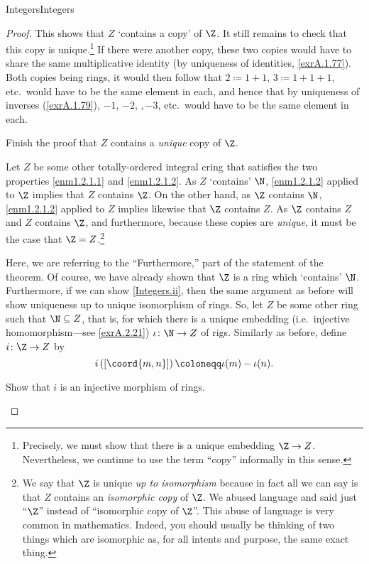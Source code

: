 \begin{thm}{Integers}{Integers}
\begin{proof}
This shows that $Z$ `contains a copy' of $\Z$.  It still remains to check that this copy is unique.\footnote{Precisely, we must show that there is a unique embedding $\Z \rightarrow Z$.  Nevertheless, we continue to use the term ``copy'' informally in this sense.}  If there were another copy, these two copies would have to share the same multiplicative identity (by uniqueness of identities, \cref{exrA.1.77}).  Both copies being rings, it would then follow that $2\coloneqq 1+1$, $3\coloneqq 1+1+1$, etc.~would have to be the same element in each, and hence that by uniqueness of inverses (\cref{exrA.1.79}), $-1$, $-2$, $,-3$, etc.~would have to be the same element in each.
\begin{exr}[breakable=false]{}{}
Finish the proof that $Z$ contains a \emph{unique} copy of $\Z$.
\end{exr}

Let $Z$ be some other totally-ordered integral cring that satisfies the two properties \cref{enm1.2.1.1} and \cref{enm1.2.1.2}.  As $Z$ `contains' $\N$, \cref{enm1.2.1.2} applied to $\Z$ implies that $Z$ contains $\Z$.  On the other hand, as $\Z$ contains $\N$, \cref{enm1.2.1.2} applied to $Z$ implies likewise that $\Z$ contains $Z$.  As $\Z$ contains $Z$ and $Z$ contains $\Z$, and furthermore, because these copies are \emph{unique}, it must be the case that $\Z =Z$.\footnote{We say that $\Z$ is unique \emph{up to isomorphism} because in fact all we can say is that $Z$ contains an \emph{isomorphic copy} of $\Z$.  We abused language and said just ``$\Z$'' instead of ``isomorphic copy of $\Z$''.  This abuse of language is very common in mathematics.  Indeed, you should usually be thinking of two things which are isomorphic as, for all intents and purpose, the same exact thing.}

Here, we are referring to the ``Furthermore,\textellipsis'' part of the statement of the theorem.  Of course, we have already shown that $\Z$ is a ring which `contains' $\N$.  Furthermore, if we can show \cref{Integers.ii}, then the same argument as before will show uniqueness up to unique isomorphism of rings.  So, let $Z$ be some other ring such that $\N \subseteq Z$, that is, for which there is a unique embedding (i.e.~injective homomorphism---see \cref{exrA.2.21}) $\iota \colon \N \rightarrow Z$ of rigs.  Similarly as before, define $i\colon \Z \rightarrow Z$ by
\begin{equation}
i\left( [\coord{m,n}]\right) \coloneqq \iota (m)-\iota (n).
\end{equation}
\begin{exr}[breakable=false]{}{}
Show that $i$ is an injective morphism of rings.
\end{exr}


\end{proof}
\end{thm}
